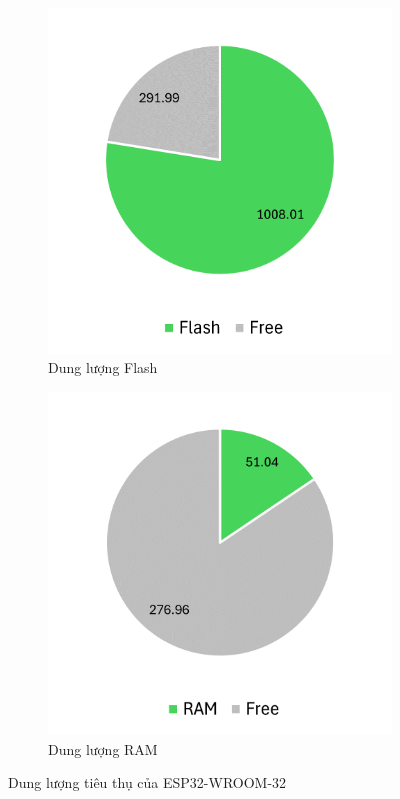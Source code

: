 \begin{figure}[H]
\centering
\begin{subfigure}[b]{0.45\textwidth} 
         \centering
         \includegraphics[width=\textwidth]{images/esp32flash.png}
         \caption{Dung lượng Flash}
\end{subfigure}
\hfill
\begin{subfigure}[b]{0.45\textwidth}
         \centering
         \includegraphics[width=\textwidth]{images/esp32ram.png}
         \caption{Dung lượng RAM}
\end{subfigure}
\caption{Dung lượng tiêu thụ của ESP32-WROOM-32}
\label{fig:esp32mem}
\end{figure}

